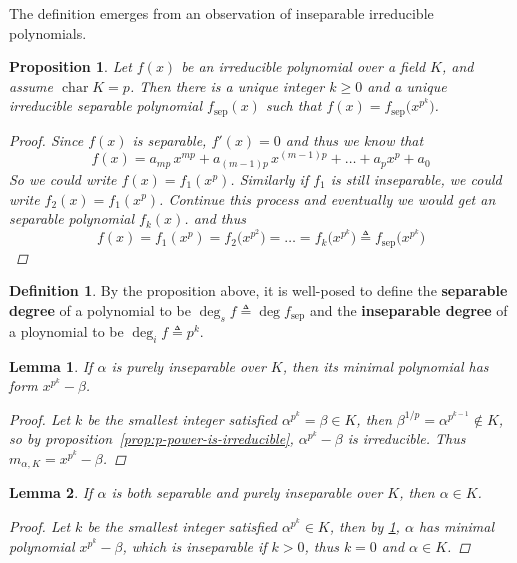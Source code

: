 \documentclass[a4paper]{article}
\newcommand{\defeq}{\triangleq}
\DeclareMathOperator{\Char}{char}
\theoremstyle{mystyle}
\newtheorem{lemma}{Lemma}
\newtheorem{proposition}{Proposition}
\theoremstyle{remark}
\theoremstyle{definition}
\theoremstyle{definition}
\newtheorem{definition}{Definition}
\begin{document}
  The definition emerges from an observation of inseparable irreducible polynomials.

  \begin{proposition} \label{prop:sep-polynomial}
    Let $f(x)$ be an irreducible polynomial over a field $K$, and assume $\Char K = p$.
    Then there is a unique integer $k \geq 0$ and a unique irreducible separable polynomial
    $f_{\text{sep}}(x)$ such that $f(x) = f_\text{sep}\big(x^{p^k}\big)$.

    \begin{proof}
      Since $f(x)$ is separable, $f'(x) = 0$ and thus we know that
      \[ f(x) = a_{mp} \, x^{mp}  + a_{(m-1)p} \, x^{(m-1)p} + \dots + a_p x^p + a_0 \]
      So we could write $f(x) = f_1(x^p)$. Similarly if $f_1$ is still inseparable, we could
      write $f_2(x) = f_1(x^p)$. Continue this process and eventually we would get an separable
      polynomial $f_k(x)$. and thus
      \[ f(x) = f_1(x^p) = f_2 \big( x^{p^2} \big) = \dots
        = f_k \big( x^{p^k} \big) \defeq f_\text{sep}\big( x^{p^k} \big) \]
    \end{proof}
  \end{proposition}

  \begin{definition}
    By the proposition above, it is well-posed to
    define the {\bf separable degree} of a polynomial to be $\deg_s f \defeq \deg f_\text{sep}$ and
    the {\bf inseparable degree} of a ploynomial to be $\deg_i f \defeq p^k$.
  \end{definition} \smallskip

  \begin{lemma} \label{lemma:purely-inseparable-min-poly}
    If $\alpha$ is purely inseparable over $K$, then its minimal polynomial has form
    $x^{p^k} - \beta$.

    \begin{proof}
      Let $k$ be the smallest integer satisfied $\alpha^{p^k} = \beta \in K$,
      then $\beta^{1/p} = \alpha^{p^{k-1}} \not\in K$, so by
      proposition~\ref{prop:p-power-is-irreducible}, $\alpha^{p^k} - \beta$
      is irreducible. Thus $m_{\alpha, K} = x^{p^k} - \beta$.
    \end{proof}
  \end{lemma}

  \begin{lemma} \label{lemma:both-sep-and-pure-insep-inside}
    If $\alpha$ is both separable and purely inseparable over $K$, then $\alpha \in K$.

    \begin{proof}
      Let $k$ be the smallest integer satisfied $\alpha^{p^k} \in K$, then by
      \ref{lemma:purely-inseparable-min-poly}, $\alpha$ has minimal polynomial $x^{p^k} - \beta$,
      which is inseparable if $k > 0$, thus $k = 0$ and $\alpha \in K$.
    \end{proof}
  \end{lemma}
\end{document}
